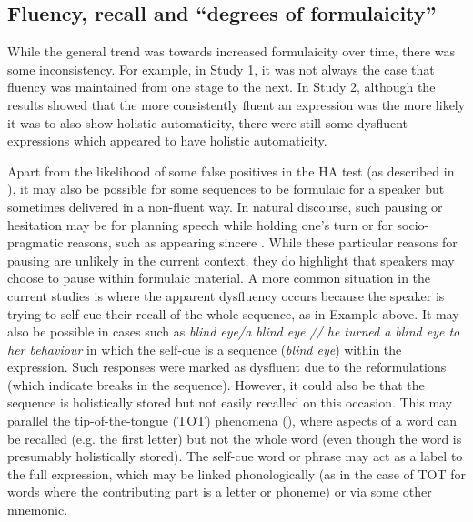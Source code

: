 \documentclass[output=paper]{langscibook}
\begin{document}
\subsection{Fluency, recall and ``degrees of formulaicity''}\label{sec:cutler:4.2}
While the general trend was towards increased formulaicity over time, there was some inconsistency. For example, in Study 1, it was not always the case that fluency was maintained from one stage to the next. In Study 2, although the results showed that the more consistently fluent an expression was the more likely it was to also show holistic automaticity, there were still some dysfluent expressions which appeared to have holistic automaticity. 

Apart from the likelihood of some false positives in the HA test (as described in ), it may also be possible for some sequences to be formulaic for a speaker but sometimes delivered in a non-fluent way. In natural discourse, such pausing or hesitation may be for planning speech while holding one’s turn \citep{Wray2019} or for socio-pragmatic reasons, such as appearing sincere \citep{Bardovi-Harlig2019}. While these particular reasons for pausing are unlikely in the current context, they do highlight that speakers may choose to pause within formulaic material. A more common situation in the current studies is where the apparent dysfluency occurs because the speaker is trying to self-cue their recall of the whole sequence, as in Example  above. It may also be possible in cases such as \textit{blind eye\slash a blind eye // he turned a blind eye to her behaviour} in which the self-cue is a sequence (\textit{blind eye}) within the expression. Such responses were marked as dysfluent due to the reformulations (which indicate breaks in the sequence). However, it could also be that the sequence is holistically stored but not easily recalled on this occasion. This may parallel the tip-of-the-tongue (TOT) phenomena (\citealt{EckeHall2013}), where aspects of a word can be recalled (e.g. the first letter) but not the whole word (even though the word is presumably holistically stored). The self-cue word or phrase may act as a label to the full expression, which may be linked phonologically (as in the case of TOT for words where the contributing part is a letter or phoneme) or via some other mnemonic.
\end{document}
